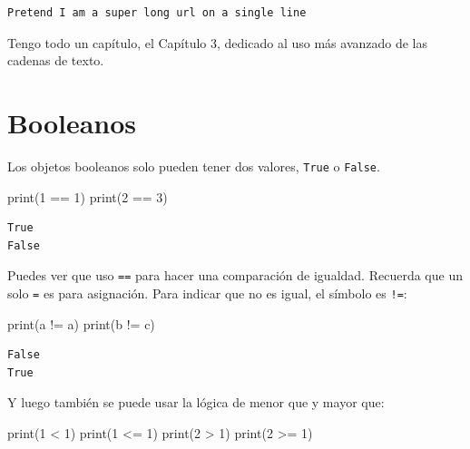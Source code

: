 \documentclass[
  letterpaper,
]{scrbook}
\newenvironment{Shaded}{\begin{snugshade}}{\end{snugshade}}
\newcommand{\BuiltInTok}[1]{\textcolor[rgb]{0.00,0.23,0.31}{#1}}
\newcommand{\DecValTok}[1]{\textcolor[rgb]{0.68,0.00,0.00}{#1}}
\newcommand{\NormalTok}[1]{\textcolor[rgb]{0.00,0.23,0.31}{#1}}
\newcommand{\OperatorTok}[1]{\textcolor[rgb]{0.37,0.37,0.37}{#1}}
\newcommand{\StringTok}[1]{\textcolor[rgb]{0.13,0.47,0.30}{#1}}
\begin{document}
\begin{verbatim}
Pretend I am a super long url on a single line
\end{verbatim}

Tengo todo un capítulo, el Capítulo 3, dedicado al uso más avanzado de
las cadenas de texto.

\section{Booleanos}\label{sec-bool}

Los objetos booleanos solo pueden tener dos valores, \texttt{True} o
\texttt{False}.

\begin{Shaded}
\begin{Highlighting}[]
\BuiltInTok{print}\NormalTok{(}\DecValTok{1} \OperatorTok{==} \DecValTok{1}\NormalTok{)}
\BuiltInTok{print}\NormalTok{(}\DecValTok{2} \OperatorTok{==} \DecValTok{3}\NormalTok{)}
\end{Highlighting}
\end{Shaded}

\begin{verbatim}
True
False
\end{verbatim}

Puedes ver que uso \texttt{==} para hacer una comparación de igualdad.
Recuerda que un solo \texttt{=} es para asignación. Para indicar que no
es igual, el símbolo es \texttt{!=}:

\begin{Shaded}
\begin{Highlighting}[]
\BuiltInTok{print}\NormalTok{(}\StringTok{\textquotesingle{}a\textquotesingle{}} \OperatorTok{!=} \StringTok{\textquotesingle{}a\textquotesingle{}}\NormalTok{)}
\BuiltInTok{print}\NormalTok{(}\StringTok{\textquotesingle{}b\textquotesingle{}} \OperatorTok{!=} \StringTok{\textquotesingle{}c\textquotesingle{}}\NormalTok{)}
\end{Highlighting}
\end{Shaded}

\begin{verbatim}
False
True
\end{verbatim}

Y luego también se puede usar la lógica de menor que y mayor que:

\begin{Shaded}
\begin{Highlighting}[]
\BuiltInTok{print}\NormalTok{(}\DecValTok{1} \OperatorTok{\textless{}} \DecValTok{1}\NormalTok{)}
\BuiltInTok{print}\NormalTok{(}\DecValTok{1} \OperatorTok{\textless{}=} \DecValTok{1}\NormalTok{)}
\BuiltInTok{print}\NormalTok{(}\DecValTok{2} \OperatorTok{\textgreater{}} \DecValTok{1}\NormalTok{)}
\BuiltInTok{print}\NormalTok{(}\DecValTok{2} \OperatorTok{\textgreater{}=} \DecValTok{1}\NormalTok{)}
\end{Highlighting}
\end{Shaded}
\end{document}
